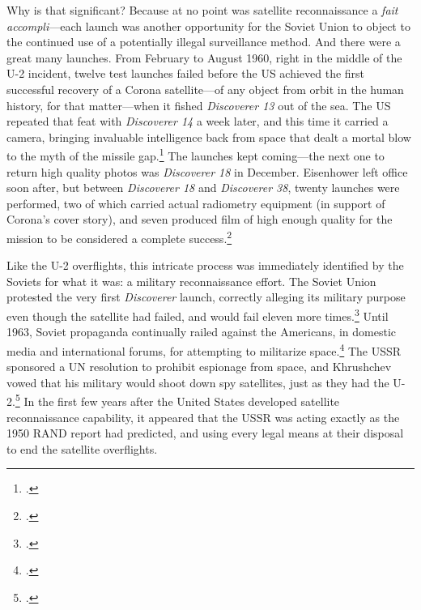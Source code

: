 \documentclass{memoir}
\begin{document}
Why is that significant? Because at no point was satellite reconnaissance a \emph{fait accompli}---each launch was another opportunity for the Soviet Union to object to the continued use of a potentially illegal surveillance method. And there were a great many launches. From February to August 1960, right in the middle of the U-2 incident, twelve test launches failed before the US achieved the first successful recovery of a Corona satellite---of any object from orbit in the human history, for that matter---when it fished \emph{Discoverer 13} out of the sea. The US repeated that feat with \emph{Discoverer 14} a week later, and this time it carried a camera, bringing invaluable intelligence back from space that dealt a mortal blow to the myth of the missile gap.\footcite[p.~101-102. The previous failures had been so demoralizing that \emph{Discoverer 13} only carried diagnostic equipment, which made its success all the more exciting. Ships on standby were able to retrieve the satellite even though it fell outside the recovery zone---\emph{Discoverer 13} many not have landed in the ballpark or the outfield, but in many respects, the mission was a home run.]{lindgren_trust_2000} The launches kept coming---the next one to return high quality photos was \emph{Discoverer 18} in December. Eisenhower left office soon after, but between \emph{Discoverer 18} and \emph{Discoverer 38}, twenty launches were performed, two of which carried actual radiometry equipment (in support of Corona's cover story), and seven produced film of high enough quality for the mission to be considered a complete success.\footcite[p.~103]{lindgren_trust_2000}

Like the U-2 overflights, this intricate process was immediately identified by the Soviets for what it was: a military reconnaissance effort. The Soviet Union protested the very first \emph{Discoverer} launch, correctly alleging its military purpose even though the satellite had failed, and would fail eleven more times.\footcite[p.~140]{day_eye_2015} Until 1963, Soviet propaganda continually railed against the Americans, in domestic media and international forums, for attempting to militarize space.\footcite[p.~271]{mcdougall_heavens_1985} The USSR sponsored a UN resolution to prohibit espionage from space, and Khrushchev vowed that his military would shoot down spy satellites, just as they had the U-2.\footcite[p.~166]{day_eye_2015} In the first few years after the United States developed satellite reconnaissance capability, it appeared that the USSR was acting exactly as the 1950 RAND report had predicted, and using every legal means at their disposal to end the satellite overflights.
\end{document}
